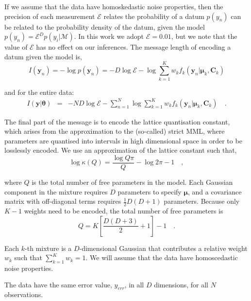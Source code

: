 \documentclass{elsarticle}
\newcommand{\vect}[1]{\boldsymbol{\mathbf{#1}}}
\def\veccov{\vect{C}}
\def\vecmean{\vect{\mu}}
\def\vectheta{\vect{\theta}}
\def\weight{w}
\def\datum{y}
\def\data{\vect{\datum}}
\begin{document}
If we assume that the data have homoskedastic noise properties, then the 
precision of each measurement $\mathcal{E}$ relates the probability of a
datum $p(\datum_n)$ can be related to the probability density of
the datum, given the model 
$p(\datum_n) = \mathcal{E}^{D}p(y_i|\mathcal{M})$.
In this work we adopt $\mathcal{E} = 0.01$, but we note that the value of
$\mathcal{E}$ has no effect on our inferences.  The message length of encoding
a datum given the model is,
\begin{equation}
  I(\data_n) = -\log{p(\data_n)} = -D\log\mathcal{E} - \log\sum_{k=1}^{K}\weight_{k}f_{k}(\data_n|\vecmean_k,\veccov_k)
\end{equation}

\noindent{}and for the entire data:
\begin{eqnarray}
  I(\data|\vectheta) &=& -ND\log\mathcal{E} - \sum_{n=1}^{N}\log\sum_{k=1}^{K}w_{k}f_k(\data_n|\vecmean_k,\veccov_k) \quad .
\end{eqnarray}

The final part of the message is to encode the lattice quantisation constant,
which arises from the approximation to the (so-called) strict MML, where
parameters are quantised into intervals in high dimensional space in order to
be losslessly encoded.  We use an approximation of the lattice constant
\citep[see Sections 5.1.12 and 3.3.4 of ][]{Wallace_2005} such that,
\begin{equation}
  \log\kappa(Q) = \frac{\log{Q\pi}}{Q} - \log{2\pi} - 1 \quad ,
\end{equation}

\noindent{}where $Q$ is the total number of free parameters in the model. Each
Gaussian component in the mixture requires $D$ parameters to specify $\vecmean$,
and a covariance matrix with off-diagonal terms requires $\frac{1}{2}D(D+1)$ 
parameters. Because only $K - 1$ weights need to be encoded, the total number of free
parameters is
\begin{equation}
	Q = K\left[\frac{D(D+3)}{2} + 1\right] - 1 \quad .
	\label{eq:number-of-parameters}
\end{equation}




 Each $k$-th mixture is a $D$-dimensional Gaussian that contributes a relative weight $\weight_k$ such that $\sum_{k=1}^{K}\weight_k = 1$. We will assume that the data have homoscedastic noise properties.

The data have the same error value, $y_{err}$, in all $D$ dimensions, for all $N$ observations.
\end{document}
